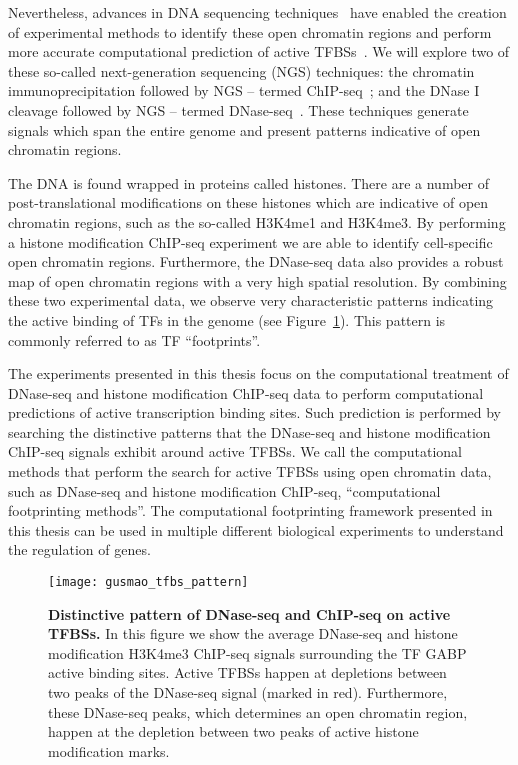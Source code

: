 Nevertheless, advances in DNA sequencing techniques~\citep{shendure2008} have enabled the creation of experimental methods to identify these open chromatin regions and perform more accurate computational prediction of active TFBSs~\citep{encode2012}. We will explore two of these so-called next-generation sequencing (NGS) techniques: the chromatin immunoprecipitation followed by NGS -- termed ChIP-seq~\citep{johnson2007}; and the DNase I cleavage followed by NGS -- termed DNase-seq~\citep{crawford2004,sabo2004a}. These techniques generate signals which span the entire genome and present patterns indicative of open chromatin regions.

The DNA is found wrapped in proteins called histones. There are a number of post-translational modifications on these histones which are indicative of open chromatin regions, such as the so-called H3K4me1 and H3K4me3. By performing a histone modification ChIP-seq experiment we are able to identify cell-specific open chromatin regions. Furthermore, the DNase-seq data also provides a robust map of open chromatin regions with a very high spatial resolution. By combining these two experimental data, we observe very characteristic patterns indicating the active binding of TFs in the genome (see Figure~\ref{fig:gusmao_tfbs_pattern}). This pattern is commonly referred to as TF ``footprints''.

The experiments presented in this thesis focus on the computational treatment of DNase-seq and histone modification ChIP-seq data to perform computational predictions of active transcription binding sites. Such prediction is performed by searching the distinctive patterns that the DNase-seq and histone modification ChIP-seq signals exhibit around active TFBSs. We call the computational methods that perform the search for active TFBSs using open chromatin data, such as DNase-seq and histone modification ChIP-seq, ``computational footprinting methods''. The computational footprinting framework presented in this thesis can be used in multiple different biological experiments to understand the regulation of genes.

\begin{figure}[h!]
\centering
\texttt{[image: gusmao\_tfbs\_pattern]}
\caption[Distinctive pattern of DNase-seq and ChIP-seq on active TFBSs]{\textbf{Distinctive pattern of DNase-seq and ChIP-seq on active TFBSs.} In this figure we show the average DNase-seq and histone modification H3K4me3 ChIP-seq signals surrounding the TF GABP active binding sites. Active TFBSs happen at depletions between two peaks of the DNase-seq signal (marked in red). Furthermore, these DNase-seq peaks, which determines an open chromatin region, happen at the depletion between two peaks of active histone modification marks.}
\label{fig:gusmao_tfbs_pattern}
\end{figure}

